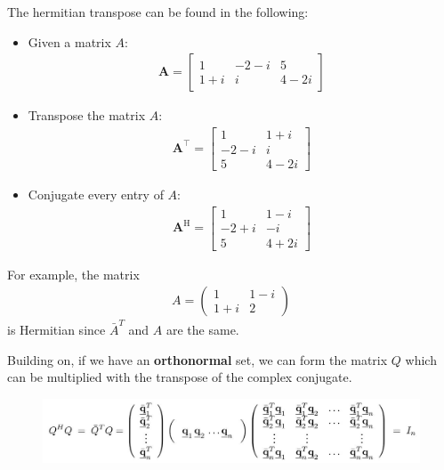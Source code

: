 \documentclass[10pt,a4paper]{article}
\begin{document}
The hermitian transpose can be found in the following:
\begin{itemize}
    \item Given a matrix $A$:
    \begin{align*}
        \boldsymbol{A}=\left[\begin{array}{ccc}
            1 & -2-i & 5 \\
            1+i & i & 4-2 i
            \end{array}\right]
    \end{align*}
    \item Transpose the matrix $A$:
    \begin{align*}
        \boldsymbol{A}^{\top}=\left[\begin{array}{cc}
            1 & 1+i \\
            -2-i & i \\
            5 & 4-2 i
            \end{array}\right]
    \end{align*}
    \item Conjugate every entry of $A$:
    \begin{align*}
        \boldsymbol{A}^{\mathrm{H}}=\left[\begin{array}{cc}
            1 & 1-i \\
            -2+i & -i \\
            5 & 4+2 i
            \end{array}\right]
    \end{align*}
\end{itemize}

For example, the matrix
\begin{align*}
    A = \begin{pmatrix}
        1 & 1-i \\
        1+i & 2
    \end{pmatrix}
\end{align*}
is Hermitian since $\bar{A}^{T}$ and $A$ are the same.

Building on, if we have an \textbf{orthonormal} set, we can form the matrix $Q$ which can be
multiplied with the transpose of the complex conjugate.
\begin{figure} [h!]
    \centering
    \includegraphics[scale=0.4]{1.JPG}
\end{figure}
\end{document}

